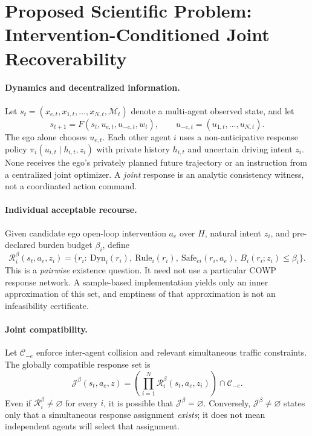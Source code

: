 \documentclass[10pt]{article}
\begin{document}
\section{Proposed Scientific Problem: Intervention-Conditioned Joint Recoverability}
\label{sec:joint_problem}
\paragraph{Dynamics and decentralized information.}
Let $s_t=(x_{e,t},x_{1,t},\ldots,x_{N,t},\mathcal M_t)$ denote a multi-agent observed state, and let
\begin{equation}
 s_{t+1}=F(s_t,u_{e,t},u_{-e,t},w_t),\qquad u_{-e,t}=(u_{1,t},\ldots,u_{N,t}).
\end{equation}
The ego alone chooses $u_{e,t}$. Each other agent $i$ uses a non-anticipative response policy $\pi_i(u_{i,t}\mid h_{i,t},z_i)$ with private history $h_{i,t}$ and uncertain driving intent $z_i$. None receives the ego's privately planned future trajectory or an instruction from a centralized joint optimizer. A \emph{joint} response is an analytic consistency witness, not a coordinated action command.

\paragraph{Individual acceptable recourse.}
Given candidate ego open-loop intervention $a_e$ over $H$, natural intent $z_i$, and pre-declared burden budget $\beta_i$, define
\begin{equation}
 \mathcal R_i^{\beta}(s_t,a_e,z_i)=\{r_i:\ \mathrm{Dyn}_i(r_i),\ \mathrm{Rule}_i(r_i),\ \mathrm{Safe}_{ei}(r_i,a_e),\ B_i(r_i;z_i)\le\beta_i\}.
\label{eq:individual_recourse}
\end{equation}
This is a \emph{pairwise} existence question. It need not use a particular COWP response network. A sample-based implementation yields only an inner approximation of this set, and emptiness of that approximation is not an infeasibility certificate.

\paragraph{Joint compatibility.}
Let $\mathcal C_{-e}$ enforce inter-agent collision and relevant simultaneous traffic constraints. The globally compatible response set is
\begin{equation}
 \mathcal J^{\beta}(s_t,a_e,z)=\left(\prod_{i=1}^{N}\mathcal R_i^{\beta}(s_t,a_e,z_i)\right)\cap\mathcal C_{-e}.
\label{eq:joint_recourse}
\end{equation}
Even if $\mathcal R_i^{\beta}\neq\varnothing$ for every $i$, it is possible that $\mathcal J^{\beta}=\varnothing$. Conversely, $\mathcal J^{\beta}\neq\varnothing$ states only that a simultaneous response assignment \emph{exists}; it does not mean independent agents will select that assignment.
\end{document}
